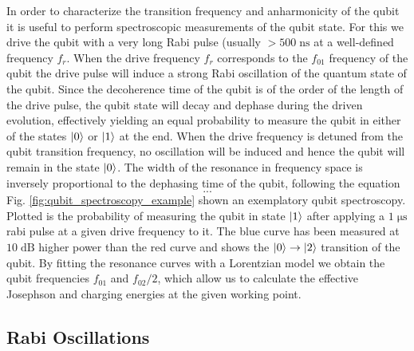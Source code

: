 In order to characterize the transition frequency and anharmonicity of the qubit it is useful to perform spectroscopic measurements of the qubit state. For this we drive the qubit with a very long Rabi pulse (usually $> 500\;\mathrm{ns}$ at a well-defined frequency $f_r$. When the drive frequency $f_r$ corresponds to the $f_{01}$ frequency of the qubit the drive pulse will induce a strong Rabi oscillation of the quantum state of the qubit. Since the decoherence time of the qubit is of the order of the length of the drive pulse, the qubit state will decay and dephase during the driven evolution, effectively yielding an equal probability to measure the qubit in either of the states $\left| 0 \right>$ or $\left| 1 \right>$ at the end. When the drive frequency is detuned from the qubit transition frequency, no oscillation will be induced and hence the qubit will remain in the state $\left| 0 \right>$. The width of the resonance in frequency space is inversely proportional to the dephasing time of the qubit, following the equation
%
\begin{equation}
...
\end{equation}
%
Fig. \ref{fig:qubit_spectroscopy_example} shown an exemplatory qubit spectroscopy. Plotted is the probability of measuring the qubit in state $\left| 1 \right>$ after applying a $1\;\mathrm{\mu s}$ rabi pulse at a given drive frequency to it. The blue curve has been measured at $10\;\mathrm{dB}$ higher power than the red curve and shows the $\left| 0 \right>\to\left| 2 \right>$ transition of the qubit. By fitting the resonance curves with a Lorentzian model we obtain the qubit frequencies $f_{01}$ and $f_{02}/2$, which allow us to calculate the effective Josephson and charging energies at the given working point.

\subsection{Rabi Oscillations}

